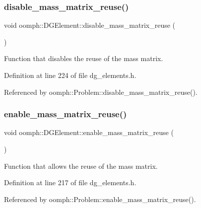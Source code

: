 \subsubsection{\texorpdfstring{disable\+\_\+mass\+\_\+matrix\+\_\+reuse()}{disable\_mass\_matrix\_reuse()}}
{\footnotesize\ttfamily void oomph\+::\+D\+G\+Element\+::disable\+\_\+mass\+\_\+matrix\+\_\+reuse (\begin{DoxyParamCaption}{ }\end{DoxyParamCaption})\hspace{0.3cm}{\ttfamily [inline]}}



Function that disables the reuse of the mass matrix. 



Definition at line 224 of file dg\+\_\+elements.\+h.



Referenced by oomph\+::\+Problem\+::disable\+\_\+mass\+\_\+matrix\+\_\+reuse().

\mbox{\label{classoomph_1_1DGElement_a62c5daa21324a839419ec4feec8e0685}} 
\subsubsection{\texorpdfstring{enable\+\_\+mass\+\_\+matrix\+\_\+reuse()}{enable\_mass\_matrix\_reuse()}}
{\footnotesize\ttfamily void oomph\+::\+D\+G\+Element\+::enable\+\_\+mass\+\_\+matrix\+\_\+reuse (\begin{DoxyParamCaption}{ }\end{DoxyParamCaption})\hspace{0.3cm}{\ttfamily [inline]}}



Function that allows the reuse of the mass matrix. 



Definition at line 217 of file dg\+\_\+elements.\+h.



Referenced by oomph\+::\+Problem\+::enable\+\_\+mass\+\_\+matrix\+\_\+reuse().

\mbox{\label{classoomph_1_1DGElement_ac4df080229516b2ceb1c045f57cb9b6d}} 
